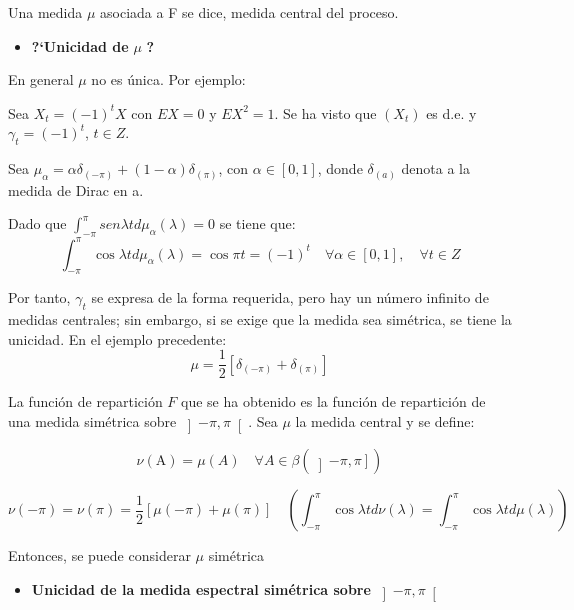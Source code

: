 Una medida $\mu$ asociada a F se dice, medida central del proceso.

\begin{itemize}
      \item \textbf{?`Unicidad de } $\mu$ \textbf{?}
\end{itemize}

En general $\mu$ no es \'{u}nica. Por ejemplo:\newline

Sea $X_{t}=(-1)^{t}X$ con $EX=0$ y $EX^{2}=1$. Se ha visto que $\left(X_{t}\right)$ es d.e. y $\gamma_{t}=\left(-1 \right)^{t}$,  $t\in Z$.\newline

Sea $\mu_{\alpha} =\alpha \delta_{(-\pi)} + (1-\alpha) \delta_{(\pi)}$, con $\alpha \in \left[0, 1\right]$, donde $\delta_{(a)}$ denota a la medida de Dirac en a.\newline

Dado que $\int_{-\pi}^{\pi} sen\lambda t d\mu_{\alpha} (\lambda)=0$ se tiene que:
\[
\int_{-\pi}^{\pi} \cos \lambda t d\mu_{\alpha} (\lambda)=\cos \pi t=\left(-1 \right)^{t}\quad\forall \alpha \in \left[0,1 \right],\quad \forall t\in Z
\]

Por tanto, $\gamma_{t}$ se expresa de la forma requerida, pero hay un n\'{u}mero infinito de medidas centrales; sin embargo, si se exige que la medida sea sim\'{e}trica, se tiene la unicidad. En el ejemplo precedente: 
\[
\mu =\frac{1}{2}\left[ {\delta_{\left( {-\pi } \right)} +\delta_{\left( 
\pi \right)} } \right]
\]

La funci\'{o}n de repartici\'{o}n $F$ que se ha obtenido es la funci\'{o}n de repartici\'{o}n de una medida sim\'{e}trica sobre $\left] {-\pi,\pi } \right[$. Sea $\mu$ la medida central y se define:

\[
\nu \left( {\text{A}} \right)=\mu \left( A \right)\quad \forall A\in \beta (\left] {-\pi ,\pi } \right])
\]

\[
\nu \left( {-\pi } \right)=\nu \left( \pi \right)=\frac{1}{2}\left[ {\mu \left( {-\pi } \right)+\mu \left( \pi \right)} \right] \quad \left( {\int_{-\pi }^\pi {\cos \lambda t} d\nu \left( \lambda \right)=\int_{-\pi }^\pi {\cos \lambda td\mu \left( \lambda \right)} } \right)
\]

Entonces, se puede considerar $\mu $ sim\'{e}trica

\begin{itemize}
\item \textbf{Unicidad de la medida espectral sim\'{e}trica sobre }$\left]-\pi, \pi \right[$
\end{itemize}


